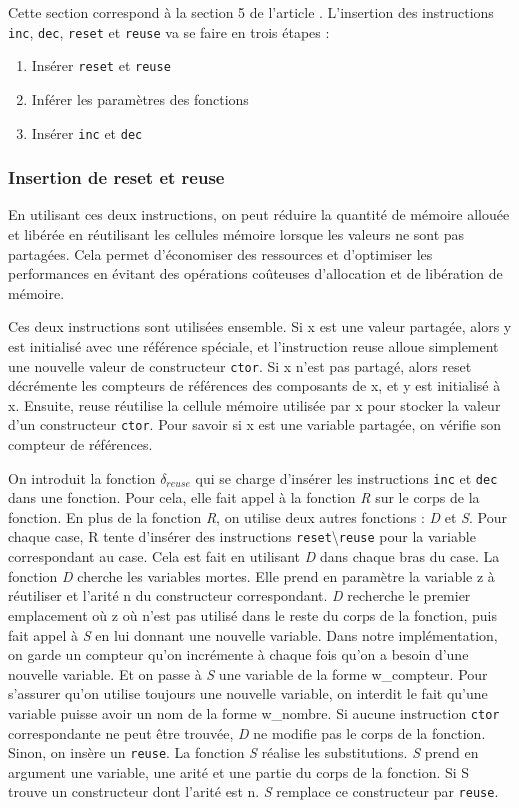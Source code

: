 \documentclass{rapportECL}
\begin{document}
Cette section correspond à la section 5 de l'article \cite{ullrich_counting_2020}.
L'insertion des instructions \verb|inc|, \verb|dec|, \verb|reset| et \verb|reuse| va se faire en trois étapes :
\begin{enumerate}
    \item Insérer \verb|reset| et \verb|reuse|
    \item Inférer les paramètres des fonctions
    \item Insérer \verb|inc| et \verb|dec|
\end{enumerate}

\subsubsection{Insertion de reset et reuse}
En utilisant ces deux instructions, on peut réduire la quantité de mémoire allouée et libérée en réutilisant les cellules mémoire lorsque les valeurs ne sont pas partagées. Cela permet d'économiser des ressources et d'optimiser les performances en évitant des opérations coûteuses d'allocation et de 
libération de mémoire.

Ces deux instructions sont utilisées ensemble. Si x est une valeur partagée, alors y est initialisé avec une référence spéciale, et l'instruction reuse alloue simplement une nouvelle valeur de constructeur \verb|ctor|. 
Si x n'est pas partagé, alors reset décrémente les compteurs de références des composants de x, et y est initialisé à x. 
Ensuite, reuse réutilise la cellule mémoire utilisée par x pour stocker la valeur d'un constructeur \verb|ctor|. Pour savoir si x est une variable partagée, on vérifie son compteur de références.

On introduit la fonction $\delta_{reuse}$ qui se charge d'insérer les instructions \verb|inc| et \verb|dec| dans une fonction. Pour cela, elle fait appel à la fonction \textit{R} sur le corps de la fonction.
En plus de la fonction \textit{R}, on utilise deux autres fonctions : \textit{D} et \textit{S}.
Pour chaque case, R tente d'insérer des instructions \verb|reset|\textbackslash \verb|reuse| pour la variable correspondant au case. Cela est fait en utilisant \textit{D} dans chaque bras du case.
La fonction \textit{D} cherche les variables mortes. Elle prend en paramètre la variable z à réutiliser et l'arité n du constructeur correspondant. 
\textit{D} recherche le premier emplacement où z où n'est pas utilisé dans le reste du corps de la fonction, puis fait appel à \textit{S} en lui donnant une nouvelle variable. 
Dans notre implémentation, on garde un compteur qu'on incrémente à chaque fois qu'on a besoin d'une nouvelle variable. Et on passe à \textit{S} une variable de la forme w\_compteur. Pour s'assurer qu'on utilise toujours une nouvelle variable, on interdit le fait qu'une variable puisse avoir un nom de la forme w\_nombre. Si aucune instruction \verb|ctor| correspondante ne peut être trouvée, \textit{D} ne modifie pas le corps de la fonction. Sinon, on insère un \verb|reuse|.
La fonction \textit{S} réalise les substitutions. \textit{S} prend en argument une variable, une arité et une partie du corps de la fonction. Si S trouve un constructeur dont l'arité est n. \textit{S} remplace ce constructeur par \verb|reuse|.
\end{document}
